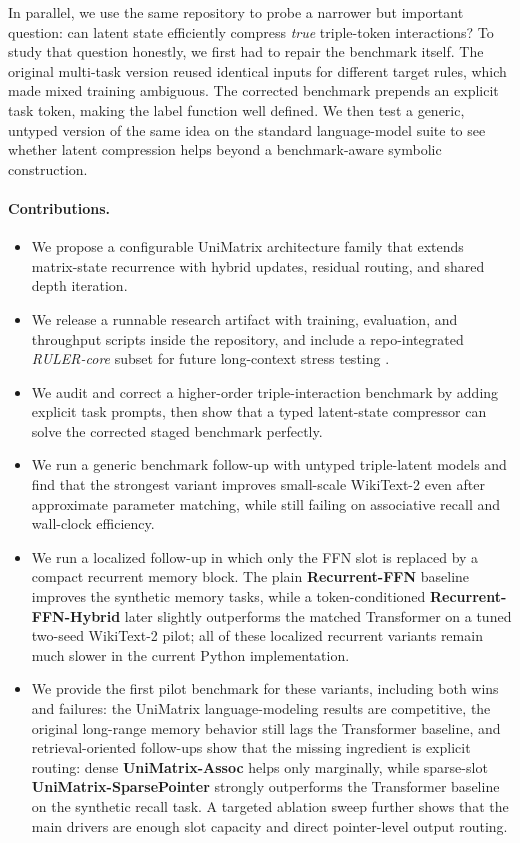 \documentclass[11pt]{article}
\begin{document}
In parallel, we use the same repository to probe a narrower but important
question: can latent state efficiently compress \emph{true} triple-token
interactions? To study that question honestly, we first had to repair the
benchmark itself. The original multi-task version reused identical inputs for
different target rules, which made mixed training ambiguous. The corrected
benchmark prepends an explicit task token, making the label function well
defined. We then test a generic, untyped version of the same idea on the
standard language-model suite to see whether latent compression helps beyond a
benchmark-aware symbolic construction.

\paragraph{Contributions.}
\begin{itemize}[leftmargin=1.25em]
  \item We propose a configurable UniMatrix architecture family that extends
  matrix-state recurrence with hybrid updates, residual routing, and shared
  depth iteration.
  \item We release a runnable research artifact with training, evaluation, and
  throughput scripts inside the repository, and include a repo-integrated
  \textit{RULER-core} subset for future long-context stress testing
  \citep{hsieh2024ruler}.
  \item We audit and correct a higher-order triple-interaction benchmark by
  adding explicit task prompts, then show that a typed latent-state compressor
  can solve the corrected staged benchmark perfectly.
  \item We run a generic benchmark follow-up with untyped triple-latent models
  and find that the strongest variant improves small-scale WikiText-2 even
  after approximate parameter matching, while still failing on associative
  recall and wall-clock efficiency.
  \item We run a localized follow-up in which only the FFN slot is replaced by
  a compact recurrent memory block. The plain \textbf{Recurrent-FFN} baseline
  improves the synthetic memory tasks, while a token-conditioned
  \textbf{Recurrent-FFN-Hybrid} later slightly outperforms the matched
  Transformer on a tuned two-seed WikiText-2 pilot; all of these localized
  recurrent variants remain much slower in the current Python implementation.
  \item We provide the first pilot benchmark for these variants, including both
  wins and failures: the UniMatrix language-modeling results are competitive,
  the original long-range memory behavior still lags the Transformer
  baseline, and retrieval-oriented follow-ups show that the missing ingredient
  is explicit routing: dense \textbf{UniMatrix-Assoc} helps only marginally,
  while sparse-slot \textbf{UniMatrix-SparsePointer} strongly outperforms the
  Transformer baseline on the synthetic recall task. A targeted ablation sweep
  further shows that the main drivers are enough slot capacity and direct
  pointer-level output routing.
\end{itemize}
\end{document}
